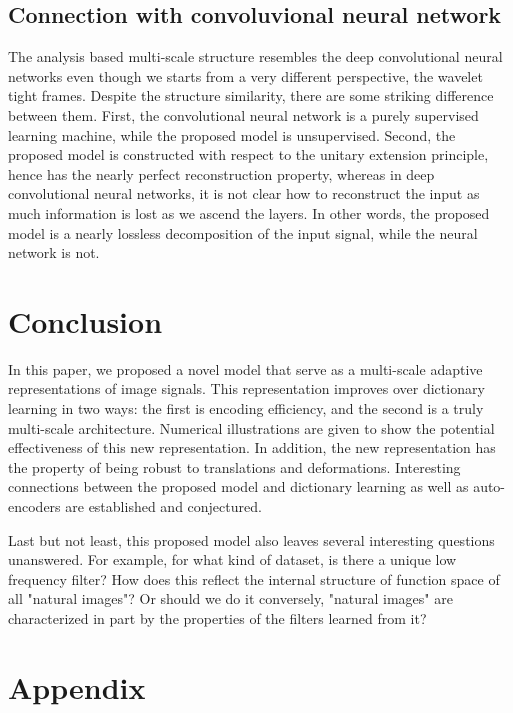\documentclass[a4paper]{article}
\begin{document}
{\color{blue}\subsection{Connection with convoluvional neural network}
The analysis based multi-scale structure resembles the deep convolutional neural networks even though we starts from a very different perspective, the wavelet tight frames. Despite the structure similarity, there are some striking difference between them. First, the convolutional neural network is a purely supervised learning machine, while the proposed model is unsupervised. Second, the proposed model is constructed with respect to the unitary extension principle, hence has the nearly perfect reconstruction property, whereas in deep convolutional neural networks, it is not clear how to reconstruct the input as much information is lost as we ascend the layers. In other words, the proposed model is a nearly lossless decomposition of the input signal, while the neural network is not.
}








\newpage
\section{Conclusion}
In this paper, we proposed a novel model that serve as a multi-scale adaptive representations of image signals. This representation improves over dictionary learning in two ways: the first is encoding efficiency, and the second is a truly multi-scale architecture. Numerical illustrations are given to show the potential effectiveness of this new representation. In addition, the new representation has the property of being robust to translations and deformations. Interesting connections between the proposed model and dictionary learning as well as auto-encoders are established and conjectured. 

Last but not least, this proposed model also leaves several interesting questions unanswered. For example, for what kind of dataset, is there a unique low frequency filter? How does this reflect the internal structure of function space of all "natural images"? Or should we do it conversely, "natural images" are characterized in part by the properties of the filters learned from it?

\section{Appendix}
\end{document}
